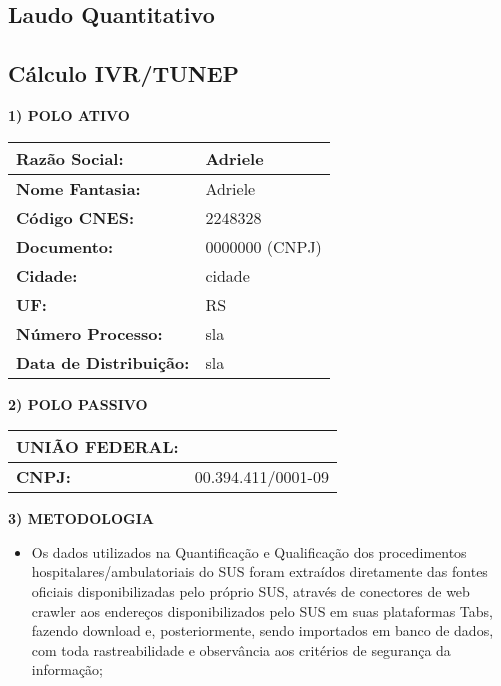 \documentclass{article}
\begin{document}
      
      \pagestyle{empty}
      
      \begin{landscape}
          
          \section*{Laudo Quantitativo}
          \subsection*{Cálculo IVR/TUNEP}

    \textbf{1) POLO ATIVO}

    \begin{tabular}{l l}
    \hline
    \textbf{Razão Social:} & Adriele \\
    \hline
    \textbf{Nome Fantasia:} & Adriele \\
    \hline
    \textbf{Código CNES:} & 2248328 \\
    \hline
    \textbf{Documento:} & 0000000 (CNPJ) \\
    \hline
    \textbf{Cidade:} & cidade \\
    \hline
    \textbf{UF:} & RS \\
    \hline
    \textbf{Número Processo:} & sla \\
    \hline
    \textbf{Data de Distribuição:} & sla \\
    \hline
    \end{tabular}

    \vspace{10mm}

    \textbf{2) POLO PASSIVO}

    \begin{tabular}{l l}
    \hline
    \textbf{UNIÃO FEDERAL:} & \\
    \hline
    \textbf{CNPJ:} & 00.394.411/0001-09 \\
    \hline
    \end{tabular}

    \vspace{10mm}

    \textbf{3) METODOLOGIA}

    \begin{itemize}
    \item Os dados utilizados na Quantificação e Qualificação dos procedimentos hospitalares/ambulatoriais do SUS foram extraídos diretamente das fontes oficiais disponibilizadas pelo próprio SUS, através de conectores de web crawler aos endereços disponibilizados pelo SUS em suas plataformas Tabs, fazendo download e, posteriormente, sendo importados em banco de dados, com toda rastreabilidade e observância aos critérios de segurança da informação;


\end{itemize}
\end{landscape}
\end{document}
